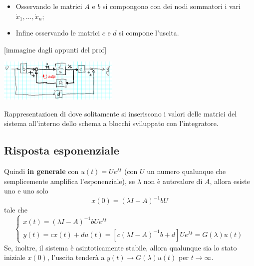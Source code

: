 \begin{landscape}
\begin{multicols*}{3}
\begin{itemize}
        \item Osservando le matrici $A$ e $b$ si compongono con dei nodi sommatori i vari $\dot{x}_1, \dots, \dot{x}_n$;
        \item Infine osservando le matrici $c$ e $d$ si compone l'uscita.
    \end{itemize}
    [immagine dagli appunti del prof]
    \begin{center}
        \includegraphics[height=2cm]{../lezione8/img1.PNG}
    \end{center}
    Rappresentazioen di dove solitamente si inseriscono i valori delle matrici del sistema all'interno dello schema a blocchi sviluppato con l'integratore.
    \subsection*{Risposta esponenziale}
    Quindi \textbf{in generale} con $u(t) = U e^{\lambda t}$ (con $U$ un numero qualunque che semplicemente amplifica l'esponenziale), se $\lambda$ non è autovalore di $A$, allora esiste uno e uno solo 
    \[
        x(0) = (\lambda I - A)^{-1}b U
    \] tale che 
    \[
        \begin{cases}
            x(t) = (\lambda I -A)^{-1} b U e^{\lambda t}\\
            y(t) = cx(t) + du(t) =  [c(\lambda I -A)^{-1} b + d] U e^{\lambda t} = G(\lambda) u(t)
        \end{cases}
    \]
    Se, inoltre, il sistema è asintoticamente stabile, allora qualunque sia lo stato iniziale $x(0)$, l'uscita tenderà a $y(t) \rightarrow G(\lambda) u(t)$ per $t \rightarrow  \infty$.

\end{multicols*}
\end{landscape}
